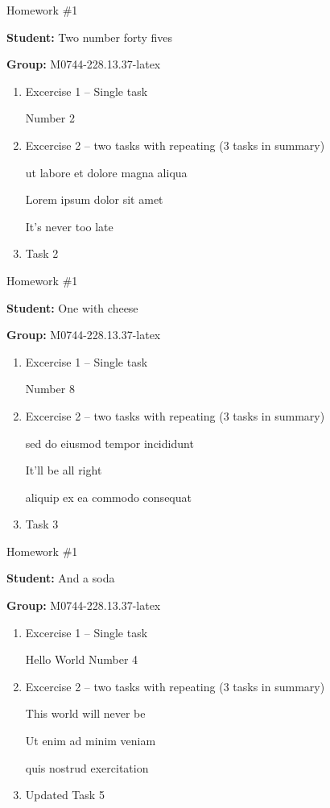 \documentclass[12pt, fleqn, a4paper]{article}
\newcommand{\preamble}{\lipsum[1]}
\newcommand{\generatepage}[4]{
	\begin{center}
		{\Large #1}

		\textbf{Student:} #2

		\textbf{Group:} #3

	\end{center}

	\vspace{10pt}

	\preamble

	\begin{enumerate}
		#4
	\end{enumerate}

	\pagebreak
}
\begin{document}
	\generatepage{Homework \#1}{Two number forty fives}{M0744-228.13.37-latex}{
		\item Excercise 1 -- Single task

			Number 2
		\item Excercise 2 -- two tasks with repeating (3 tasks in summary)

			ut labore et dolore magna aliqua 

			Lorem ipsum dolor sit amet

			It's never too late
		\item 

			Task 2
	}

	\generatepage{Homework \#1}{One with cheese}{M0744-228.13.37-latex}{
		\item Excercise 1 -- Single task

			Number 8
		\item Excercise 2 -- two tasks with repeating (3 tasks in summary)

			sed do eiusmod tempor incididunt 

			It'll be all right

			aliquip ex ea commodo consequat
		\item 

			Task 3
	}

	\generatepage{Homework \#1}{And a {\LARGE soda}}{M0744-228.13.37-latex}{
		\item Excercise 1 -- Single task

			Hello World Number 4
		\item Excercise 2 -- two tasks with repeating (3 tasks in summary)

			This world will never be

			Ut enim ad minim veniam

			quis nostrud exercitation 
		\item 

			Updated Task 5
	}
\end{document}

